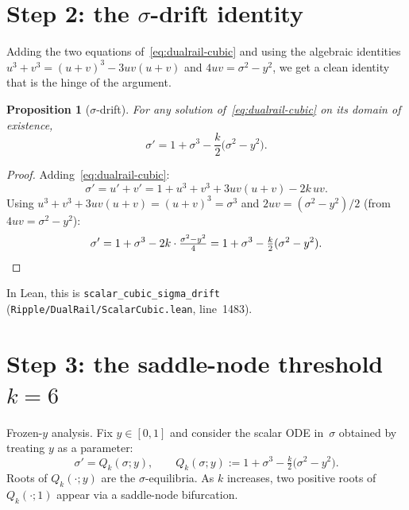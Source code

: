 \documentclass[11pt]{article}
\newtheorem{proposition}[theorem]{Proposition}
\begin{document}
\section{Step 2: the $\sigma$-drift identity}\label{sec:sigma}

Adding the two equations of~\eqref{eq:dualrail-cubic} and using the algebraic
identities $u^{3} + v^{3} = (u+v)^{3} - 3uv(u+v)$ and
$4uv = \sigma^{2} - y^{2}$, we get a clean identity that is the hinge of the
argument.

\begin{proposition}[$\sigma$-drift]\label{prop:sigma-drift}
For any solution of~\eqref{eq:dualrail-cubic} on its domain of existence,
\begin{equation}\label{eq:sigma-drift}
  \sigma'
  = 1 + \sigma^{3} - \frac{k}{2}\bigl(\sigma^{2} - y^{2}\bigr).
\end{equation}
\end{proposition}

\begin{proof}
Adding~\eqref{eq:dualrail-cubic}:
\[
  \sigma' = u' + v' = 1 + u^{3} + v^{3} + 3uv(u + v) - 2k\, u v.
\]
Using $u^{3} + v^{3} + 3uv(u+v) = (u+v)^{3} = \sigma^{3}$ and
$2uv = (\sigma^{2} - y^{2})/2$ (from $4uv = \sigma^{2} - y^{2}$):
\[
  \sigma' = 1 + \sigma^{3} - 2k \cdot \tfrac{\sigma^{2} - y^{2}}{4}
         = 1 + \sigma^{3} - \tfrac{k}{2}(\sigma^{2} - y^{2}). \qedhere
\]
\end{proof}

In Lean, this is \texttt{scalar\_cubic\_sigma\_drift}
(\texttt{Ripple/DualRail/ScalarCubic.lean}, line~1483).

\section{Step 3: the saddle-node threshold $k = 6$}

Frozen-$y$ analysis.  Fix $y \in [0, 1]$ and consider the scalar ODE in~$\sigma$
obtained by treating $y$ as a parameter:
\begin{equation}\label{eq:frozen}
  \sigma' = Q_{k}(\sigma; y), \qquad
  Q_{k}(\sigma; y) := 1 + \sigma^{3} - \tfrac{k}{2}\bigl(\sigma^{2} - y^{2}\bigr).
\end{equation}
Roots of $Q_{k}(\cdot; y)$ are the $\sigma$-equilibria.  As $k$ increases, two
positive roots of $Q_{k}(\cdot; 1)$ appear via a saddle-node bifurcation.
\end{document}
